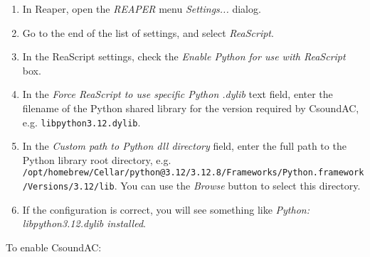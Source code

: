 \documentclass[letterpaper,10pt,DIV=12,parskip=half]{scrartcl}
\begin{document}
\begin{enumerate}
\item In Reaper, open the \emph{REAPER} menu \emph{Settings...} dialog.
\item Go to the end of the list of settings, and select \emph{ReaScript}.
\item In the ReaScript settings, check the \emph{Enable Python for use with ReaScript} box.
\item In the \emph{Force ReaScript to use specific Python .dylib} text field, enter the filename of the Python shared library for the version required by CsoundAC, e.g. \lstinline|libpython3.12.dylib|. 
\item In the \emph{Custom path to Python dll directory} field, enter the full path to the Python library root directory, e.g. \lstinline|/opt/homebrew/Cellar/python@3.12/3.12.8/Frameworks/Python.framework/Versions/3.12/lib|. You can use the \emph{Browse} button to select this directory.
\item If the configuration is correct, you will see something like \emph{Python: libpython3.12.dylib installed}.
\end{enumerate}

\noindent To enable CsoundAC:
\end{document}

